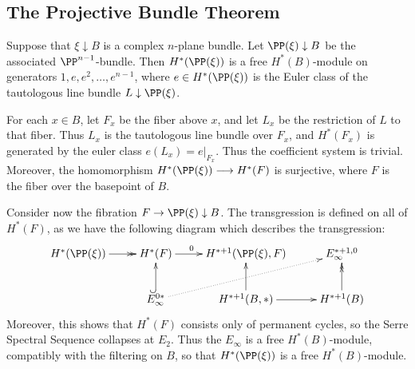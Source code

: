 \documentclass[11pt]{article}
\newcommand{\myheading}[1]
{{\noindent\Large #1}

}
\renewcommand{\myheading}[1]{\subsection{#1}}
\begin{document}
\begin{projective bundle theorem}
\myheading{The Projective Bundle Theorem}
Suppose that $\xi\downarrow B$ is a complex $n$-plane bundle. Let $\PP(\xi)\downarrow B$ be the associated $\PP^{n-1}$-bundle. Then $H^*(\PP(\xi))$ is a free $H^*(B)$-module on generators $1,e,e^2,\ldots,e^{n-1}$, where $e\in H^*(\PP(\xi))$ is the Euler class of the tautologous line bundle $L\downarrow \PP(\xi)$.

For each $x\in B$, let $F_x$ be the fiber above $x$, and let $L_x$ be the restriction of $L$ to that fiber. Thus $L_x$ is the tautologous line bundle over $F_x$, and $H^*(F_x)$ is generated by the euler class $e(L_x)=e|_{F_x}$. Thus the coefficient system is trivial. Moreover, the homomorphism $H^*(\PP(\xi))\to H^*(F)$ is surjective, where $F$ is the fiber over the basepoint of $B$.

Consider now the fibration $F \rightarrow\PP(\xi)\downarrow B$. The transgression is defined on all of $H^*(F)$, as we have the following diagram which describes the transgression:
\[\xymatrix{
H^*(\PP(\xi))\ar@{->>}[r]&H^*(F)\ar[r]^{0\ \ \ \ \ }&H^{*+1}(\PP(\xi),F)&E_\infty^{*+1,0}\\
&E_\infty^{0*}\ar@{^{(}->}[u]\ar@{.>}[rur]&H^{*+1}(B,*)\ar[u]\ar[r]&H^{*+1}(B)\ar@{->>}[u]
}\]
Moreover, this shows that $H^*(F)$ consists only of permanent cycles, so the Serre Spectral Sequence collapses at $E_2$. Thus the $E_\infty$ is a free $H^*(B)$-module, compatibly with the filtering on $B$, so that $H^*(\PP(\xi))$ is a free $H^*(B)$-module.



\end{projective bundle theorem}
\end{document}
